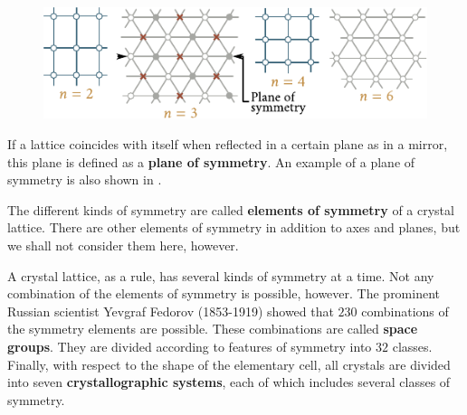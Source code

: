 \begin{figure}[t]
	\begin{center}
		\includegraphics[scale=1.1]{figures/ch_13/fig_13_3.pdf}
		\caption[]{}
		\label{fig:13_3}
	\end{center}
	\vspace{-0.8cm}
\end{figure}

If a lattice coincides with itself when reflected in a certain plane as in a mirror, this plane is defined as a \textbf{plane of symmetry}. An example of a plane of symmetry is also shown in .

The different kinds of symmetry are called \textbf{elements of symmetry} of a crystal lattice. There are other elements of symmetry in addition to axes and planes, but we shall not consider them here, however.

A crystal lattice, as a rule, has several kinds of symmetry at a time. Not any combination of the elements of symmetry is possible, however. The prominent Russian scientist Yevgraf Fedorov (1853-1919) showed that $230$ combinations of the symmetry elements are possible. These combinations are called \textbf{space groups}. They are divided according to features of symmetry into $32$ classes. Finally, with respect to the shape of the elementary cell, all crystals are divided into seven \textbf{crystallographic systems}, each of which includes several classes of symmetry.

